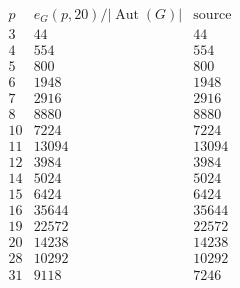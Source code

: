\[\begin{array}{c|rr}
p& e_G(p,20)/|\operatorname{Aut}(G)|&\text{source}\\\hline
3&44&44\\
4&554&554\\
5&800&800\\
6&1948&1948\\
7&2916&2916\\
8&8880&8880\\
10&7224&7224\\
11&13094&13094\\
12&3984&3984\\
14&5024&5024\\
15&6424&6424\\
16&35644&35644\\
19&22572&22572\\
20&14238&14238\\
28&10292&10292\\
31&9118&7246\\
\end{array}\]
